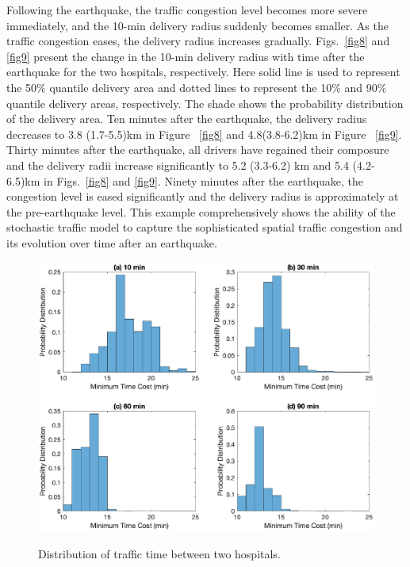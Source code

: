 \documentclass[review,11pt,nonatbib]{elsarticle}
\begin{document}
Following the earthquake, the traffic congestion level becomes more severe immediately, and the 10-min delivery radius suddenly becomes smaller. As the traffic congestion eases, the delivery radius increases gradually. Figs.~\ref{fig8} and \ref{fig9} present the change in the 10-min delivery radius with time after the earthquake for the two hospitals, respectively. Here  solid line is used to represent the 50\% quantile delivery area and dotted lines to represent the 10\% and 90\% quantile delivery areas, respectively. The shade shows the probability distribution of the delivery area. Ten minutes after the earthquake, the delivery radius decreases to 3.8 (1.7-5.5)km in Figure ~\ref{fig8} and 4.8(3.8-6.2)km in Figure ~\ref{fig9}. Thirty minutes after the earthquake, all drivers have regained their composure and the delivery radii increase significantly to 5.2 (3.3-6.2) km and 5.4 (4.2-6.5)km in Figs.~\ref{fig8} and \ref{fig9}. Ninety minutes after the earthquake, the congestion level is eased significantly and the delivery radius is approximately at the pre-earthquake level. This example comprehensively shows the ability of the stochastic traffic model to capture the sophisticated spatial traffic congestion and its evolution over time after an earthquake.   

\begin{figure}[!htp]\centering
\includegraphics[width = 15cm]{hospital_path.eps}\\
\caption{Distribution of traffic time between two hospitals.}\label{fig6}
\end{figure}
\end{document}
